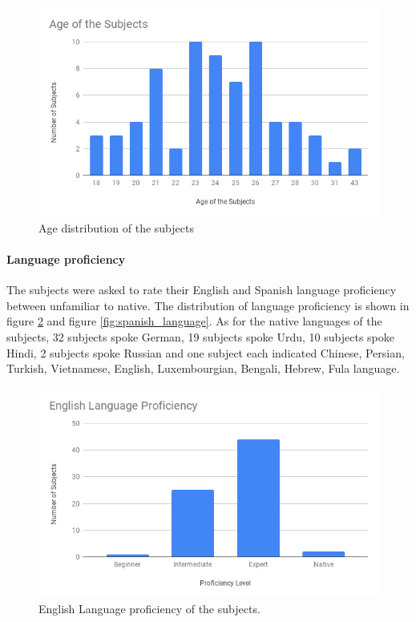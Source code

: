 \begin{figure}
    \centering
    \includegraphics[width=140mm]{Figures/age_of_subjects.png}
    \caption{Age distribution of the subjects}
    \label{fig:age_distribution}
\end{figure}

\paragraph{Language proficiency} The subjects were asked to rate their English and Spanish language proficiency between unfamiliar to native. The distribution of language proficiency is shown in figure \ref{fig:english_language} and figure \ref{fig:spanish_language}. As for the native languages of the subjects, 32 subjects spoke German, 19 subjects spoke Urdu, 10 subjects spoke Hindi, 2 subjects spoke Russian and one subject each indicated Chinese, Persian, Turkish, Vietnamese, English, Luxembourgian, Bengali, Hebrew, Fula language.

\begin{figure}
    \centering
    \includegraphics[width=140mm]{Figures/english_language_proficiency.png}
    \caption{English Language proficiency of the subjects.}
    \label{fig:english_language}
\end{figure}

